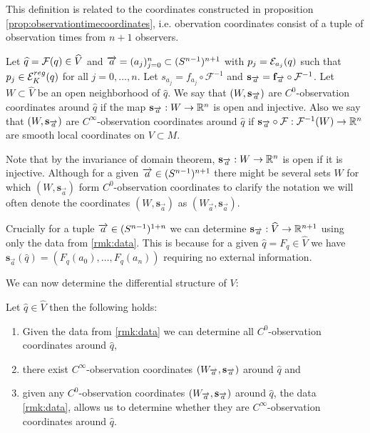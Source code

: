 This definition is related to the coordinates constructed in proposition \ref{prop:observationtimecoordinates}, i.e. obervation coordinates consist of a tuple of observation times from $n+1$ observers.
\begin{definition}
Let $\widehat{q}=\F(q)\in \widehat{V}$ and $\aa = (a_j)^n_{j=0}\subset (\sn)^{n+1}$ with $p_j = \mc{E}_{a_j}(q)$ such that $p_j\in \er(q)$ for all $j=0,\dots,n$. Let $s_{a_j} = f_{a_j} \circ \mathcal{F}^{-1}$ and $\mathbf{s}_{\overrightarrow{a}}=\mathbf{f}_{\overrightarrow{a}}\circ\mc{F}^{-1}$. Let $W\subset\widehat{V}$ be an open neighborhood of $\widehat{q}$. We say that $(W,\mathbf{s}_\aa)$ are $C^0$-observation coordinates around $\widehat{q}$ if the map $\mathbf{s}_\aa:W\to \R^n$ is open and injective. Also we say that $(W,\mathbf{s}_\aa)$ are $C^\infty$-observation coordinates around $\widehat{q}$ if $\mathbf{s}_{\overrightarrow{a}}\circ\mc{F}:\mc{F}^{-1}(W)\to \R^n$ are smooth local coordinates on $V\subset M$.
\end{definition}
Note that by the invariance of domain theorem, $\mathbf{s}_{\overrightarrow{a}}:W\to \R^n$ is open if it is injective.
Although for a given $\overrightarrow{a}\in (\sn)^{n+1}$ there might be several sets $W$ for which $(W,\mathbf{s}_{\overrightarrow{a}})$ form $C^0$-observation coordinates to clarify the notation we will often denote the coordinates $(W,\mathbf{s}_{\overrightarrow{a}})$ as $(W_{\overrightarrow{a}},\mathbf{s}_{\overrightarrow{a}})$. 

Crucially for a tuple $\overrightarrow{a}\in (\sn)^{1+n}$ we can determine $\mathbf{s}_{\overrightarrow{a}}:\widehat{V}\to \R^{n+1}$ using only the data from \ref{rmk:data}. This is because for a given $\widehat{q}=F_q\in \widehat{V}$ we have $\mathbf{s}_{\overrightarrow{a}}(\widehat{q}) = (F_q(a_0),\dots,F_q(a_n))$ requiring no external information.

We can now determine the differential structure of $V$:
\begin{proposition}\label{prop:findsmoothcoords}
Let  $\widehat{q}\in \widehat{V}$ then the following holds:
\begin{enumerate}[label={\textnormal{(\arabic*)}}]
    \item Given the data from \ref{rmk:data} we can determine all $C^0$-observation coordinates around $\widehat{q}$,
    \item there exist $C^\infty$-observation coordinates $(W_\aa,\mathbf{s}_\aa)$ around $\widehat{q}$ and
    \item given any $C^0$-observation coordinates $(W_\aa,\mathbf{s}_\aa)$ around $\widehat{q}$, the data \ref{rmk:data}, allows us to determine whether they are $C^\infty$-observation coordinates around $\widehat{q}$.
\end{enumerate}
\end{proposition}

